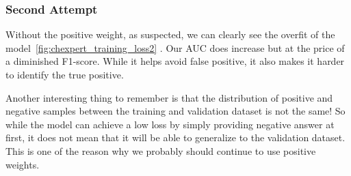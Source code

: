 \documentclass[11pt]{article}
\begin{document}
            \subsubsection{Second Attempt}
            
                Without the positive weight, as suspected, we can clearly see the overfit of the model~\ref{fig:chexpert_training_loss2} .
                Our AUC does increase but at the price of a diminished F1-score. While it helps avoid false positive, it also makes it harder to identify
                the true positive.

                Another interesting thing to remember is that the distribution of positive and negative samples between the training and validation
                dataset is not the same! So while the model can achieve a low loss by simply providing negative answer at first,
                it does not mean that it will be able to generalize to the validation dataset. This is one of the reason why we probably should continue to use
                positive weights.
\end{document}
